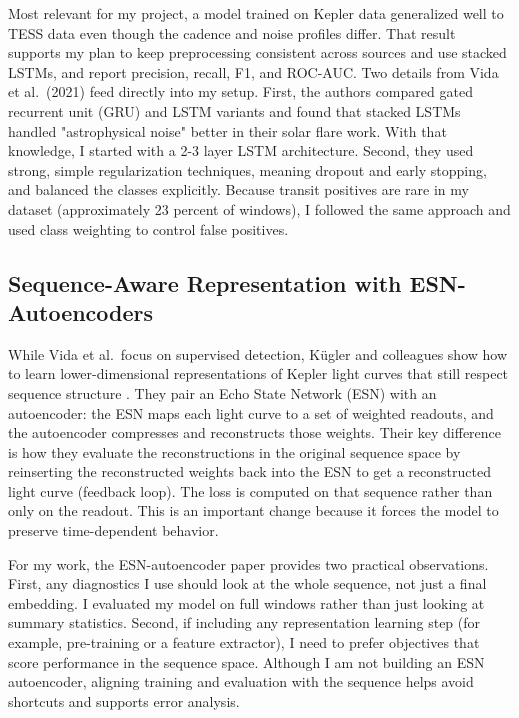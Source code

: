 \documentclass[letterpaper]{article}
\begin{document}
Most relevant for my project, a model trained on Kepler data generalized well to TESS data even though the cadence and noise profiles differ. That result supports my plan to keep preprocessing consistent across sources and use stacked LSTMs, and report precision, recall, F1, and ROC-AUC. Two details from Vida et al.\ (2021) feed directly into my setup. First, the authors compared gated recurrent unit (GRU) and LSTM variants and found that stacked LSTMs handled "astrophysical noise" better in their solar flare work. With that knowledge, I started with a 2-3 layer LSTM architecture. Second, they used strong, simple regularization techniques, meaning dropout and early stopping, and balanced the classes explicitly. Because transit positives are rare in my dataset (approximately 23 percent of windows), I followed the same approach and used class weighting to control false positives.

\subsection{Sequence-Aware Representation with ESN-Autoencoders}

While Vida et al.\ focus on supervised detection, Kügler and colleagues show how to learn lower-dimensional representations of Kepler light curves that still respect sequence structure \cite{kugler2016explorativeapproachkepler}. They pair an Echo State Network (ESN) with an autoencoder: the ESN maps each light curve to a set of weighted readouts, and the autoencoder compresses and reconstructs those weights. Their key difference is how they evaluate the reconstructions in the original sequence space by reinserting the reconstructed weights back into the ESN to get a reconstructed light curve (feedback loop). The loss is computed on that sequence rather than only on the readout. This is an important change because it forces the model to preserve time-dependent behavior.

For my work, the ESN-autoencoder paper provides two practical observations. First, any diagnostics I use should look at the whole sequence, not just a final embedding. I evaluated my model on full windows rather than just looking at summary statistics. Second, if including any representation learning step (for example, pre-training or a feature extractor), I need to prefer objectives that score performance in the sequence space. Although I am not building an ESN autoencoder, aligning training and evaluation with the sequence helps avoid shortcuts and supports error analysis.
\end{document}
